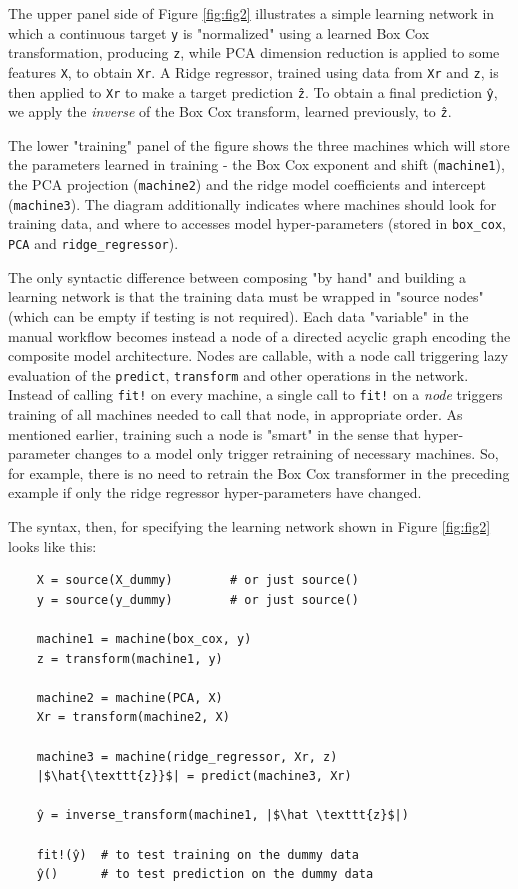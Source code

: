 \documentclass{article}
\begin{document}
The upper panel side of Figure \ref{fig:fig2} illustrates a simple learning network in which a continuous target \texttt{y} is "normalized" using a learned Box Cox transformation, producing \texttt{z}, while PCA dimension reduction is applied to some features \texttt{X}, to obtain \texttt{Xr}. A Ridge regressor, trained using data from \texttt{Xr} and \texttt{z}, is then applied to \texttt{Xr} to make a target prediction \texttt{\^{z}}. To obtain a final prediction \texttt{\^{y}}, we apply the \textit{inverse} of the Box Cox transform, learned previously, to \texttt{\^{z}}. 

The lower "training" panel of the figure shows the three machines which will store the parameters learned in training - the Box Cox exponent and shift (\texttt{machine1}), the PCA projection (\texttt{machine2}) and the ridge model coefficients and intercept (\texttt{machine3}). The diagram additionally indicates where machines should look for training data, and where to accesses model hyper-parameters (stored in \texttt{box\_cox}, \texttt{PCA} and \texttt{ridge\_regressor}).

The only syntactic difference between composing "by hand" and building a learning network is that the training data must be wrapped in "source nodes" (which can be empty if testing is not required). Each data "variable" in the manual workflow becomes instead a node of a directed acyclic graph encoding the composite model architecture. Nodes are callable, with a node call triggering lazy evaluation of the \texttt{predict}, \texttt{transform} and other operations in the network. Instead of calling \texttt{fit!} on every machine, a single call to \texttt{fit!} on a \textit{node} triggers training of all machines needed to call that node, in appropriate order. As mentioned earlier, training such a node is "smart" in the sense that hyper-parameter changes to a model only trigger retraining of necessary machines. So, for example, there is no need to retrain the Box Cox transformer in the preceding example if only the ridge regressor hyper-parameters have changed.

The syntax, then, for specifying the learning network shown in Figure \ref{fig:fig2} looks like this:

\begin{verbatim}
    X = source(X_dummy)        # or just source()
    y = source(y_dummy)        # or just source()
    
    machine1 = machine(box_cox, y)
    z = transform(machine1, y)
    
    machine2 = machine(PCA, X)
    Xr = transform(machine2, X)
    
    machine3 = machine(ridge_regressor, Xr, z)
    |$\hat{\texttt{z}}$| = predict(machine3, Xr)
    
    ŷ = inverse_transform(machine1, |$\hat \texttt{z}$|)
    
    fit!(ŷ)  # to test training on the dummy data
    ŷ()      # to test prediction on the dummy data
\end{verbatim}
\end{document}

